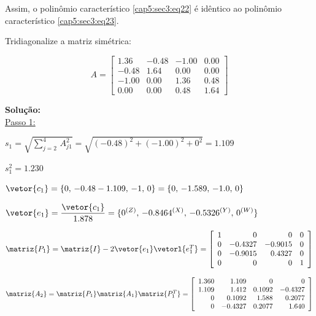 Assim, o polinômio característico \ref{cap5:sec3:eq22} é idêntico ao polinômio característico \ref{cap5:sec3:eq23}.

\begin{example}

Tridiagonalize a matriz simétrica:

\[
 A = 
 \left[
  \begin{array}{rrrr}
   1.36 & -0.48 & -1.00 & 0.00\\
   -0.48 & 1.64 & 0.00 & 0.00\\
   -1.00 & 0.00 & 1.36 & 0.48\\
   0.00 & 0.00 & 0.48 & 1.64
  \end{array}
 \right]
\]

\textbf{Solução:}\\

\underline{Passo 1:}

\begin{enumerar}

\item $ s_1 = \sqrt{\sum_{j=2}^4 \, A_{j1}^2} = \sqrt{(-0.48)^2 + (-1.00)^2 + 0^2} = 1.109 $

$ s_1^2 = 1.230 $

\item $ \vetor{c_1} = \{0, \, -0.48 - 1.109, \, -1, \, 0 \} = \{0, \, -1.589, \, -1.0, \, 0 \} $

\item $ \vetor{e_1} = \displaystyle \frac{ \vetor{c_1} }{ 1.878 } = \{0^{(Z)}, \, -0.8464^{(X)}, \, -0.5326^{(Y)}, \, 0^{(W)} \} $

\item $ \matriz{P_1} = \matriz{I} - 2 \vetor{e_1} \vetorl{e_1^T} =
\left[
 \begin{array}{crrc}
  1 & 0 & 0 & 0\\
  0 & -0.4327 & -0.9015 & 0\\
  0 & -0.9015 & 0.4327 & 0\\
  0 & 0 & 0 & 1
 \end{array}
\right]
$

\item $ \matriz{A_2} = \matriz{P_1} \matriz{A_1} \matriz{P_1^T} = 
\left[
 \begin{array}{rrrr}
  1.360 & 1.109 & 0 & 0\\
  1.109 & 1.412 & 0.1092 & -0.4327\\
  0 & 0.1092 & 1.588 & 0.2077\\
  0 & -0.4327 & 0.2077 & 1.640
 \end{array}
\right]
$


\end{enumerar}
\end{example}
